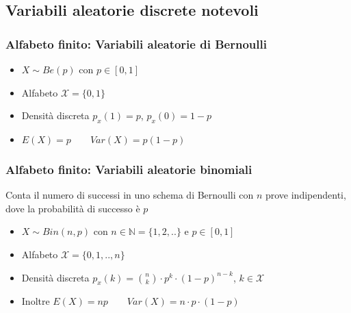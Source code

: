 \documentclass[10pt,a4paper]{article}
\begin{document}
\begin{multicols}{2}
\subsection*{Variabili aleatorie discrete notevoli}
\subsubsection*{Alfabeto finito: Variabili aleatorie di Bernoulli}
\begin{itemize}
    \item $X\sim Be(p)$ con $p \in [0, 1]$ 
    \item Alfabeto $\mathcal{X} = \{0,1\}$
    \item Densità discreta $p_x(1) = p$, $p_x(0) = 1-p$
    \item $E(X) = p \qquad Var(X) = p(1-p)$
\end{itemize}
\subsubsection*{Alfabeto finito: Variabili aleatorie binomiali}
Conta il numero di successi in uno schema di Bernoulli con $n$ prove indipendenti, dove la probabilità di successo è $p$
\begin{itemize}
    \item $X\sim Bin(n,p)$ con $n \in \mathbb{N} = \{1,2,..\}$ e $p \in [0, 1]$ 
    \item Alfabeto $\mathcal{X} = \{0,1,..,n\}$
    \item Densità discreta $p_x(k) =\binom{n}{k} \cdot p^k \cdot (1-p)^{n-k}$, $k \in \mathcal{X}$
    \item Inoltre $E(X) = np \qquad Var(X) = n\cdot p\cdot(1-p)$
\end{itemize}

\end{multicols}
\end{document}
